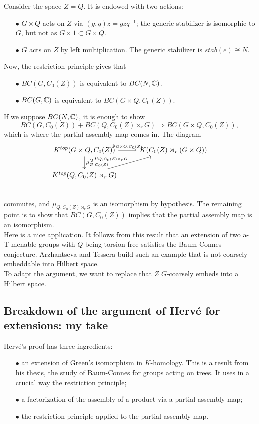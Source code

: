 Consider the space $Z = Q$. It is endowed with two actions:
\begin{itemize}
\item[$\bullet$] $G\times Q$ acts on $Z$ via $(g,q)z = gzq^{-1}$; the generic stabilizer is isomorphic to $G$, but not as $G\times 1 \subset G\times Q$.
\item[$\bullet$] $G$ acts on $Z$ by left multiplication. The generic stabilizer is $stab(e) \cong N$.
\end{itemize}

Now, the restriction principle gives that 
\begin{itemize}
\item[$\bullet$] $BC(G,C_0(Z))$ is equivalent to $BC(N,\mathbb C)$.
\item[$\bullet$] $BC(G,\mathbb C)$ is equivalent to $BC(G\times Q,C_0(Z))$.
\end{itemize}

If we suppose $BC(N,\mathbb C)$, it is enough to show
\[BC(G,C_0(Z)) + BC(Q,C_0(Z)\rtimes_r G) \Rightarrow BC(G\times Q,C_0(Z)),\]
which is where the partial assembly map comes in. The diagram 
\[\begin{tikzcd}
K^{top}(G\times Q , C_0(Z)) \arrow{r}{\mu_{G\times Q, C_0(Z)}} \arrow{d}{\mu^{Q}_{G,C_0(Z)}}& K(C_0(Z)\rtimes_r (G\times Q)) \\
K^{top}(Q , C_0(Z)\rtimes_r G) \arrow{ru}{\mu_{Q,C_0(Z)\rtimes_r G}}& \\
\end{tikzcd}\]
commutes, and $\mu_{Q,C_0(Z)\rtimes_r G}$ is an isomorphism by hypothesis. The remaining point is to show that $BC(G,C_0(Z))$ implies that the partial assembly map is an isomorphism.\\

Here is a nice application. It follows from this result that an extension of two a-T-menable groups with $Q$ being torsion free satisfies the Baum-Connes conjecture. Arzhantseva and Tessera build such an example that is not coarsely embeddable into Hilbert space.\\

To adapt the argument, we want to replace that $Z$ $G$-coarsely embeds into a Hilbert space.

\subsection{Breakdown of the argument of Herv\'e for extensions: my take}

Herv\'e's proof has three ingredients:
\begin{itemize}
\item[$\bullet$] an extension of Green's isomorphism in $K$-homology. This is a result from his thesis, the study of Baum-Connes for groups acting on trees. It uses in a crucial way the restriction principle;
\item[$\bullet$] a factorization of the assembly of a product via  a partial assembly map; 
\item[$\bullet$] the restriction principle applied to the partial assembly map.
\end{itemize}

